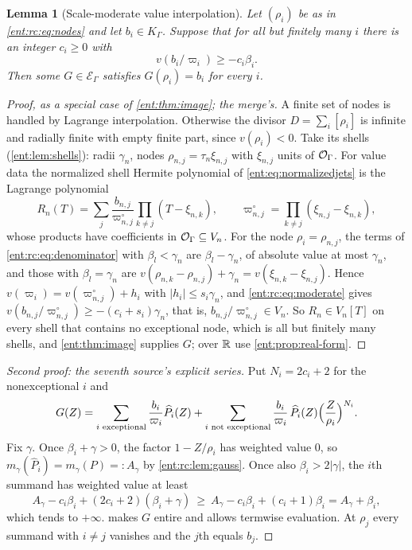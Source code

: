 \documentclass[11pt]{article}
\theoremstyle{plain}
\newtheorem{lemma}[lemma]{Lemma}
\theoremstyle{plain}
\theoremstyle{plain}
\theoremstyle{definition}
\theoremstyle{definition}
\theoremstyle{definition}
\theoremstyle{definition}
\theoremstyle{remark}
\newcommand{\K}{K_\Gamma}\newcommand{\KD}{K_\Delta}
\newcommand{\E}{\mathcal E_\Gamma}
\newcommand{\abs}[1]{\lvert#1\rvert}
\begin{document}
\begin{lemma}[Scale-moderate value interpolation]\label{ent:rc:lem:interpolation}
Let $(\rho_i)$ be as in \eqref{ent:rc:eq:nodes} and let $b_i\in\K$. Suppose
that for all but finitely many $i$ there is an integer $c_i\ge0$ with
\begin{equation}\label{ent:rc:eq:moderate}
 v(b_i/\varpi_i)\ge-c_i\beta_i .
\end{equation}
Then some $G\in\E$ satisfies $G(\rho_i)=b_i$ for every $i$.
\end{lemma}
\begin{proof}[Proof, as a special case of \cref{ent:thm:image}; the merge's]
A finite set of nodes is handled by Lagrange interpolation. Otherwise the
divisor $D=\sum_i[\rho_i]$ is infinite and radially finite with empty finite
part, since $v(\rho_i)<0$. Take its shells (\cref{ent:lem:shells}): radii
$\gamma_n$, nodes $\rho_{n,j}=\tau_n\xi_{n,j}$ with $\xi_{n,j}$ units of $\mathcal O_\Gamma$.
For value data the normalized shell Hermite polynomial of
\eqref{ent:eq:normalizedjets} is the Lagrange polynomial
\[
 R_n(T)=\sum_j\frac{b_{n,j}}{\varpi^\circ_{n,j}}\prod_{k\ne j}(T-\xi_{n,k}),
 \qquad \varpi^\circ_{n,j}=\prod_{k\ne j}(\xi_{n,j}-\xi_{n,k}),
\]
whose products have coefficients in $\mathcal O_\Gamma\subseteq V_n$. For the node
$\rho_i=\rho_{n,j}$, the terms of \eqref{ent:rc:eq:denominator} with
$\beta_l<\gamma_n$ are $\beta_l-\gamma_n$, of absolute value at most $\gamma_n$,
and those with $\beta_l=\gamma_n$ are $v(\rho_{n,k}-\rho_{n,j})+\gamma_n=
v(\xi_{n,k}-\xi_{n,j})$. Hence $v(\varpi_i)=v(\varpi^\circ_{n,j})+h_i$ with
$|h_i|\le s_i\gamma_n$, and \eqref{ent:rc:eq:moderate} gives
$v(b_{n,j}/\varpi^\circ_{n,j})\ge-(c_i+s_i)\gamma_n$, that is,
$b_{n,j}/\varpi^\circ_{n,j}\in V_n$. So $R_n\in V_n[T]$ on every shell that contains
no exceptional node, which is all but finitely many shells, and
\cref{ent:thm:image} supplies $G$; over $\mathbb R$ use \cref{ent:prop:real-form}.
\end{proof}
\begin{proof}[Second proof: the seventh source's explicit series]
Put $N_i=2c_i+2$ for the nonexceptional $i$ and
\begin{equation}\label{ent:rc:eq:cardinal}
 G(Z)=\sum_{i\text{ exceptional}}\frac{b_i}{\varpi_i}\widehat P_i(Z)
 +\sum_{i\text{ not exceptional}}
 \frac{b_i}{\varpi_i}\,\widehat P_i(Z)\Bigl(\frac Z{\rho_i}\Bigr)^{N_i}.
\end{equation}
Fix $\gamma$. Once $\beta_i+\gamma>0$, the factor $1-Z/\rho_i$ has weighted
value $0$, so $m_\gamma(\widehat P_i)=m_\gamma(P)=:A_\gamma$ by
\cref{ent:rc:lem:gauss}. Once also $\beta_i>2\abs\gamma$, the $i$th summand has
weighted value at least
\[
 A_\gamma-c_i\beta_i+(2c_i+2)(\beta_i+\gamma)
 \ \ge\ A_\gamma-c_i\beta_i+(c_i+1)\beta_i=A_\gamma+\beta_i ,
\]
which tends to $+\infty$.  makes $G$ entire and allows
termwise evaluation. At $\rho_j$ every summand with $i\ne j$ vanishes and the
$j$th equals $b_j$.
\end{proof}
\end{document}
